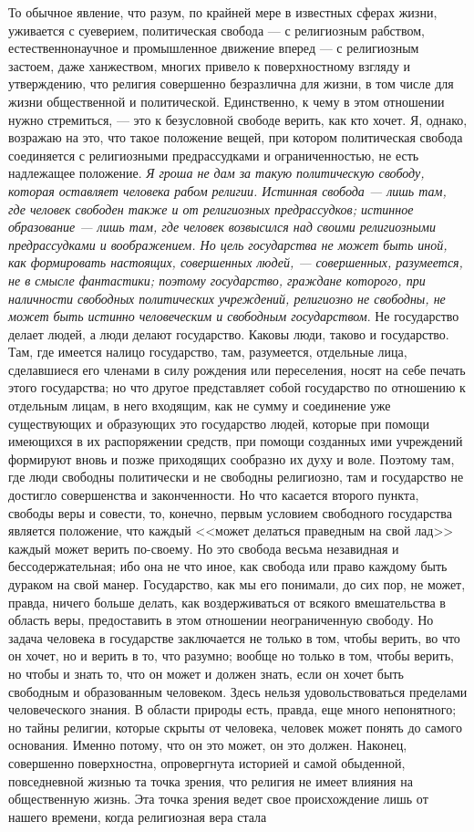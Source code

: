 \documentclass[12pt]{article}
\begin{document}
То обычное явление, что разум, по крайней мере в известных сферах жизни, уживается с суеверием, политическая свобода --- с религиозным рабством, естественнонаучное и промышленное движение вперед --- с религиозным застоем, даже ханжеством, многих привело к поверхностному взгляду и утверждению, что религия совершенно безразлична для жизни, в том числе для жизни общественной и политической. Единственно, к чему в этом отношении нужно стремиться, --- это к безусловной свободе верить, как кто хочет. Я, однако, возражаю на это, что такое положение вещей, при котором политическая свобода соединяется с религиозными предрассудками и ограниченностью, не есть надлежащее положение. \emph{Я гроша не дам за такую политическую свободу, которая оставляет человека рабом религии. Истинная свобода --- лишь там, где человек свободен также и от религиозных предрассудков; истинное образование --- лишь там, где человек возвысился над своими религиозными предрассудками и воображением. Но цель государства не может быть иной, как формировать настоящих, совершенных людей, --- совершенных, разумеется, не в смысле фантастики; поэтому государство, граждане которого, при наличности свободных политических учреждений, религиозно не свободны, не может быть истинно человеческим и свободным государством}. Не государство делает людей, а люди делают государство. Каковы люди, таково и государство. Там, где имеется налицо государство, там, разумеется, отдельные лица, сделавшиеся его членами в силу рождения или переселения, носят на себе печать этого государства; но что другое представляет собой государство по отношению к отдельным лицам, в него входящим, как не сумму и соединение уже существующих и образующих это государство людей, которые при помощи имеющихся в их распоряжении средств, при помощи созданных ими учреждений формируют вновь и позже приходящих сообразно их духу и воле. Поэтому там, где люди свободны политически и не свободны религиозно, там и государство не достигло совершенства и законченности. Но что касается второго пункта, свободы веры и совести, то, конечно, первым условием свободного государства является положение, что каждый <<может делаться праведным на свой лад>>  каждый может верить по-своему. Но это свобода весьма незавидная и бессодержательная; ибо она не что иное, как свобода или право каждому быть дураком на свой манер. Государство, как мы его понимали, до сих пор, не может, правда, ничего больше делать, как воздерживаться от всякого вмешательства в область веры, предоставить в этом отношении неограниченную свободу. Но задача человека в государстве заключается не только в том, чтобы верить, во что он хочет, но и верить в то, что разумно; вообще но только в том, чтобы верить, но чтобы и знать то, что он может и должен знать, если он хочет быть свободным и образованным человеком. Здесь нельзя удовольствоваться пределами человеческого знания. В области природы есть, правда, еще много непонятного; но тайны религии, которые скрыты от человека, человек может понять до самого основания. Именно потому, что он это может, он это должен. Наконец, совершенно поверхностна, опровергнута историей и самой обыденной, повседневной жизнью та точка зрения, что религия не имеет влияния на общественную жизнь. Эта точка зрения ведет свое происхождение лишь от нашего времени, когда религиозная вера стала 
\end{document}
